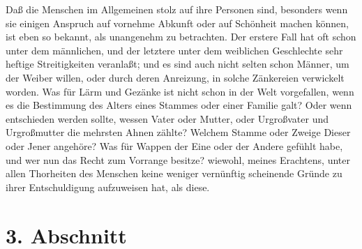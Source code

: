 Daß die Menschen im Allgemeinen stolz auf ihre Personen sind, besonders wenn sie
einigen Anspruch auf vornehme Abkunft oder auf
Schönheit machen können, ist eben
so bekannt, als unangenehm zu betrachten. Der erstere Fall hat oft schon unter
dem männlichen, und der letztere unter dem weiblichen Geschlechte sehr heftige
Streitigkeiten veranlaßt; und es sind auch nicht selten schon Männer, um der
Weiber willen, oder durch deren Anreizung, in solche Zänkereien verwickelt
worden. Was für Lärm und Gezänke ist nicht schon in der Welt vorgefallen, wenn
es die Bestimmung des Alters eines Stammes oder einer Familie galt? Oder wenn
entschieden werden sollte, wessen Vater oder Mutter, oder Urgroßvater und
Urgroßmutter die mehrsten Ahnen zählte? Welchem Stamme oder Zweige Dieser oder
Jener angehöre? Was für Wappen der Eine oder der Andere gefühlt
habe, und wer
nun das Recht zum Vorrange besitze? wiewohl, meines Erachtens, unter allen
Thorheiten des Menschen keine weniger vernünftig scheinende Gründe zu ihrer
Entschuldigung aufzuweisen hat, als diese.

\section{3. Abschnitt} \label{kap11_ab3}

